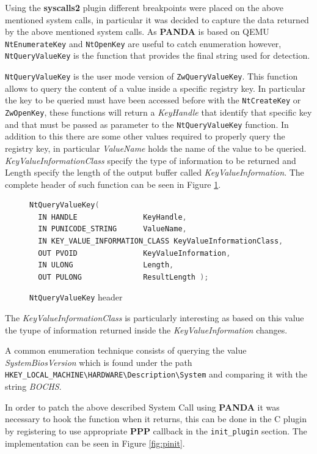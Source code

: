 Using the \textbf{syscalls2} plugin different breakpoints were placed on the above mentioned system calls, in particular it was decided to capture the data returned by the above mentioned system calls. As \textbf{PANDA} is based on QEMU  \lstinline{NtEnumerateKey} and \lstinline{NtOpenKey} are useful to catch enumeration however, \lstinline{NtQueryValueKey} is the function that provides the final string used for detection.

\lstinline{NtQueryValueKey} is the user mode version of \lstinline{ZwQueryValueKey}. This function allows to query the content of a value inside a specific registry key. In particular the key to be queried must have been accessed before with the \lstinline{NtCreateKey} or \lstinline{ZwOpenKey}, these functions will return a \textit{KeyHandle} that identify that specific key and that must be passed as parameter to the \lstinline{NtQueryValueKey} function. In addition to this there are some other values required to properly query the registry key, in particular \textit{ValueName} holds the name of the value to be queried. \textit{KeyValueInformationClass} specify the type of information to be returned and Length specify the length of the output buffer called \textit{KeyValueInformation}. The complete header of such function can be seen in Figure \ref{fig:querykey}.

\begin{figure}[htp]
\centering
\begin{lstlisting}[language=C]
NtQueryValueKey(
  IN HANDLE               KeyHandle,
  IN PUNICODE_STRING      ValueName,
  IN KEY_VALUE_INFORMATION_CLASS KeyValueInformationClass,
  OUT PVOID               KeyValueInformation,
  IN ULONG                Length,
  OUT PULONG              ResultLength );
\end{lstlisting}
\caption{\lstinline{NtQueryValueKey} header}
\label{fig:querykey}
\end{figure}

The \textit{KeyValueInformationClass} is particularly interesting as based on this value the tyupe of information returned inside the \textit{KeyValueInformation} changes.

A common enumeration technique consists of querying the value \textit{SystemBiosVersion} which is found under the path \lstinline{HKEY_LOCAL_MACHINE\HARDWARE\Description\System} and comparing it with the string \textit{BOCHS}.

In order to patch the above described System Call using \textbf{PANDA} it was necessary to hook the function when it returns, this can be done in the C plugin by registering to use appropriate \textbf{PPP} callback in the \lstinline{init_plugin} section. The implementation can be seen in Figure \ref{fig:pinit}.

